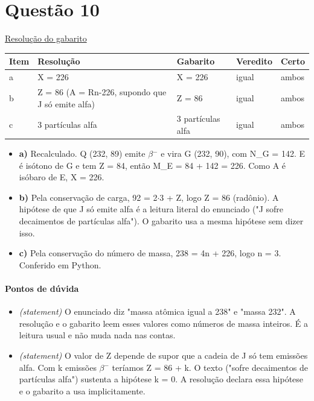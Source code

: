 \documentclass{article}%
\begin{document}
\section*{Questão 10}%
\href{https://poliedroresolve.sistemapoliedro.com.br/vestibulares/ita/2026/ita-2-fase-dia-2-29-10-2025-2-fase-dia-2/dissertativa-10-quimica-2-fase-dia-2-ita-2026}{Resolução do gabarito}\par\smallskip%
\begin{longtable}{@{}p{} p{} p{} p{} p{}@{}}\toprule Item & Resolução & Gabarito & Veredito & Certo \\ \midrule
a & X = 226 & X = 226 & igual & ambos \\
b & Z = 86 (A = Rn{-}226, supondo que J só emite alfa) & Z = 86 & igual & ambos \\
c & 3 partículas alfa & 3 partículas alfa & igual & ambos \\
\bottomrule\end{longtable}%
\begin{itemize}%
\item%
\textbf{a)} Recalculado. Q (232, 89) emite $\beta$$^{-}$ e vira G (232, 90), com N\_G = 142. E é isótono de G e tem Z = 84, então M\_E = 84 + 142 = 226. Como A é isóbaro de E, X = 226.%
\item%
\textbf{b)} Pela conservação de carga, 92 = 2$\cdot$3 + Z, logo Z = 86 (radônio). A hipótese de que J só emite alfa é a leitura literal do enunciado ("J sofre decaimentos de partículas alfa"). O gabarito usa a mesma hipótese sem dizer isso.%
\item%
\textbf{c)} Pela conservação do número de massa, 238 = 4n + 226, logo n = 3. Conferido em Python.%
\end{itemize}%
\paragraph{Pontos de dúvida}%
\begin{itemize}%
\item%
\textit{(statement)} O enunciado diz "massa atômica igual a 238" e "massa 232". A resolução e o gabarito leem esses valores como números de massa inteiros. É a leitura usual e não muda nada nas contas.%
\item%
\textit{(statement)} O valor de Z depende de supor que a cadeia de J só tem emissões alfa. Com k emissões $\beta$$^{-}$ teríamos Z = 86 + k. O texto ("sofre decaimentos de partículas alfa") sustenta a hipótese k = 0. A resolução declara essa hipótese e o gabarito a usa implicitamente.%
\end{itemize}%
\end{document}
